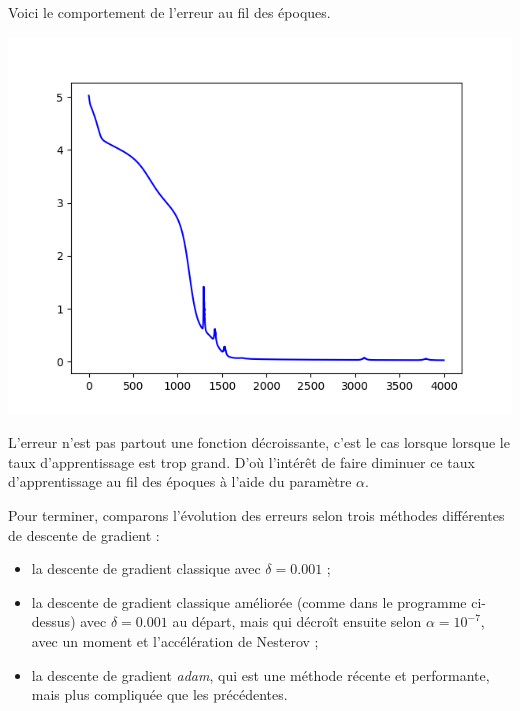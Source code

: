 \documentclass[11pt,class=report,crop=false]{standalone}
\begin{document}
Voici le comportement de l'erreur au fil des époques.
\begin{center}
\includegraphics[scale=\myscale,scale=0.5]{figures/unevar-fonction-erreur}
\end{center}

L'erreur n'est pas partout une fonction décroissante, c'est le cas lorsque lorsque le taux d'apprentissage est trop grand. D'où l'intérêt de faire diminuer ce taux d'apprentissage au fil des époques à l'aide du paramètre $\alpha$.

Pour terminer, comparons l'évolution des erreurs selon trois méthodes différentes de descente de gradient :
\begin{itemize}
  \item la descente de gradient classique avec $\delta = 0.001$ ;
  \item la descente de gradient classique  améliorée (comme dans le programme ci-dessus) avec $\delta = 0.001$ au départ, mais qui décroît ensuite selon $\alpha = 10^{-7}$, avec un moment et l'accélération de Nesterov ;
  \item la descente de gradient \og{}\emph{adam}\fg{}, qui est une méthode récente et performante, mais plus compliquée que les précédentes.
\end{itemize}
\end{document}
